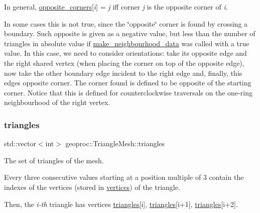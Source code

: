 In general, \hyperlink{classgeoproc_1_1TriangleMesh_a2604795c90c694116513252b86d242b4}{opposite\+\_\+corners}\mbox{[}{\itshape i}\mbox{]} = {\itshape j} iff corner {\itshape j} is the opposite corner of {\itshape i}.

In some cases this is not true, since the \char`\"{}opposite\char`\"{} corner is found by crossing a boundary. Such opposite is given as a negative value, but less than the number of triangles in absolute value if \hyperlink{classgeoproc_1_1TriangleMesh_a84003dfdfd5e591c00f01a797578ff1f}{make\+\_\+neighbourhood\+\_\+data} was called with a \textquotesingle{}true\textquotesingle{} value. In this case, we need to consider orientations\+: take its opposite edge and the \textquotesingle{}right\textquotesingle{} shared vertex (when placing the corner \textquotesingle{}on top of\textquotesingle{} the opposite edge), now take the other boundary edge incident to the \textquotesingle{}right\textquotesingle{} edge and, finally, this edge\textquotesingle{}s opposite corner. The corner found is defined to be opposite of the starting corner. Notice that this is defined for counterclockwise traversals on the one-\/ring neighbourhood of the \textquotesingle{}right\textquotesingle{} vertex. \mbox{\label{classgeoproc_1_1TriangleMesh_ad1cf20622f2bb080100862f413bd89c2}} 
\subsubsection{\texorpdfstring{triangles}{triangles}}
{\footnotesize\ttfamily std\+::vector$<$int$>$ geoproc\+::\+Triangle\+Mesh\+::triangles\hspace{0.3cm}{\ttfamily [protected]}}



The set of triangles of the mesh. 

Every three consecutive values starting at a position multiple of 3 contain the indexes of the vertices (stored in \hyperlink{classgeoproc_1_1TriangleMesh_a82c3351de37daa9440f53597f080992d}{vertices}) of the triangle.

Then, the {\itshape i-\/th} triangle has vertices \hyperlink{classgeoproc_1_1TriangleMesh_ad1cf20622f2bb080100862f413bd89c2}{triangles}\mbox{[}i\mbox{]}, \hyperlink{classgeoproc_1_1TriangleMesh_ad1cf20622f2bb080100862f413bd89c2}{triangles}\mbox{[}i+1\mbox{]}, \hyperlink{classgeoproc_1_1TriangleMesh_ad1cf20622f2bb080100862f413bd89c2}{triangles}\mbox{[}i+2\mbox{]}.

